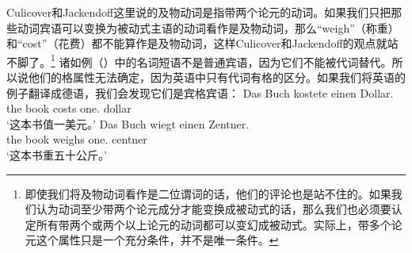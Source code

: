Culicover和Jackendoff这里说的及物动词是指带两个论元的动词。如果我们只把那些动词宾语可以变换为被动式主语的动词看作是及物动词，那么“weigh”（称重）和“cost”（花费）都不能算作是及物动词，这样Culicover和Jackendoff的观点就站不脚了。\footnote{即使我们将及物动词看作是二位谓词的话，他们的评论也是站不住的。如果我们认为动词至少带两个论元成分才能变换成被动式的话，那么我们也必须要认定所有带两个或两个以上论元的动词都可以变幻成被动式。实际上，带多个论元这个属性只是一个充分条件，并不是唯一条件。}
诸如例（）中的名词短语不是普通宾语，因为它们不能被代词替代。所以说他们的格属性无法确定，因为英语中只有代词有格的区分。如果我们将英语的例子翻译成德语，我们会发现它们是宾格宾语：
\eal
\ex 
\gll Das Buch kostete einen Dollar.\\
      the book costs one.\acc{} dollar\\
\glt `这本书值一美元。'
\ex 
\gll Das Buch wiegt einen Zentner.\\
     the book weighs one.\acc{} centner\\
\glt `这本书重五十公斤。'
\zl


